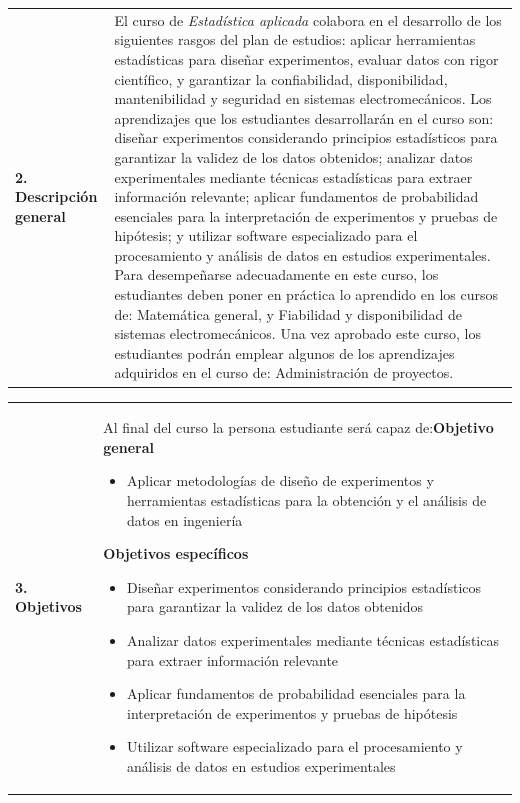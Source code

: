 \documentclass[letterpaper]{article}%
\begin{document}
\begin{tabularx}{\textwidth}{p{3cm}p{13cm}}%
\par\fontsize{12}{14}\selectfont \textbf{\textcolor{parte}{2. Descripción general}}&El curso de \emph{Estadística aplicada} colabora en el desarrollo de los siguientes rasgos del plan de estudios: aplicar herramientas estadísticas para diseñar experimentos, evaluar datos con rigor científico, y garantizar la confiabilidad, disponibilidad, mantenibilidad y seguridad en sistemas electromecánicos. \newline\newline Los aprendizajes que los estudiantes desarrollarán en el curso son: diseñar experimentos considerando principios estadísticos para garantizar la validez de los datos obtenidos; analizar datos experimentales mediante técnicas estadísticas para extraer información relevante; aplicar fundamentos de probabilidad esenciales para la interpretación de experimentos y pruebas de hipótesis; y utilizar software especializado para el procesamiento y análisis de datos en estudios experimentales. \newline\newline Para desempeñarse adecuadamente en este curso, los estudiantes deben poner en práctica lo aprendido en los cursos de: Matemática general, y Fiabilidad y disponibilidad de sistemas electromecánicos. \newline\newline Una vez aprobado este curso, los estudiantes podrán emplear algunos de los aprendizajes adquiridos en el curso de: Administración de proyectos. \\%
\end{tabularx}%
\vspace*{4mm}%
\newline%
\begin{tabularx}{\textwidth}{p{3cm}p{13cm}}%
\par\fontsize{12}{14}\selectfont \textbf{\textcolor{parte}{3. Objetivos}}&Al final del curso la persona estudiante será capaz de:\newline\newline \textbf{Objetivo general}\begin{itemize}\item Aplicar metodologías de diseño de experimentos y herramientas estadísticas para la obtención y el análisis de datos en ingeniería\end{itemize} \vspace{2mm}\textbf{Objetivos específicos}\begin{itemize}\item Diseñar experimentos considerando principios estadísticos para garantizar la validez de los datos obtenidos\item Analizar datos experimentales mediante técnicas estadísticas para extraer información relevante\item Aplicar fundamentos de probabilidad esenciales para la interpretación de experimentos y pruebas de hipótesis\item Utilizar software especializado para el procesamiento y análisis de datos en estudios experimentales\end{itemize}\\%
\end{tabularx}%
\end{document}
